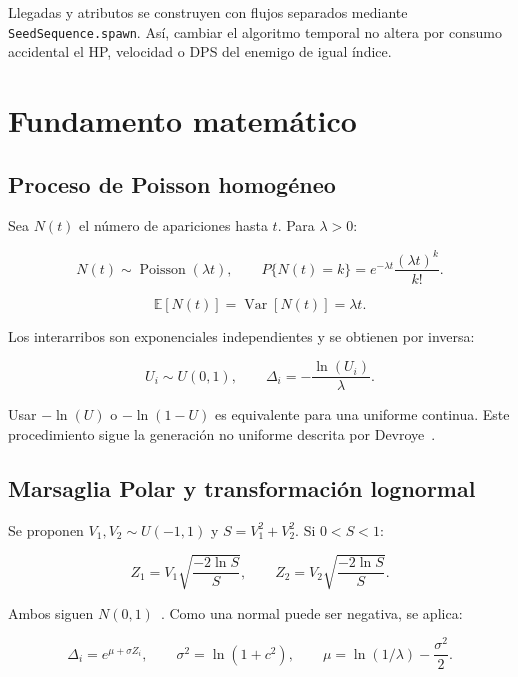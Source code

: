 \documentclass[11pt,a4paper]{article}
\begin{document}
Llegadas y atributos se construyen con flujos separados mediante
\texttt{SeedSequence.spawn}. Así, cambiar el algoritmo temporal no altera por
consumo accidental el HP, velocidad o DPS del enemigo de igual índice.

\section{Fundamento matemático}

\subsection{Proceso de Poisson homogéneo}

Sea $N(t)$ el número de apariciones hasta $t$. Para $\lambda>0$:

\begin{equation}
N(t)\sim\operatorname{Poisson}(\lambda t),\qquad
P\{N(t)=k\}=e^{-\lambda t}\frac{(\lambda t)^k}{k!}.
\end{equation}

\begin{equation}
\mathbb{E}[N(t)]=\operatorname{Var}[N(t)]=\lambda t.
\end{equation}

Los interarribos son exponenciales independientes y se obtienen por inversa:

\begin{equation}
U_i\sim U(0,1),\qquad
\boxed{\Delta_i=-\frac{\ln(U_i)}{\lambda}}.
\end{equation}

Usar $-\ln(U)$ o $-\ln(1-U)$ es equivalente para una uniforme continua.
Este procedimiento sigue la generación no uniforme descrita por
Devroye~\cite{devroye}.

\subsection{Marsaglia Polar y transformación lognormal}

Se proponen $V_1,V_2\sim U(-1,1)$ y $S=V_1^2+V_2^2$. Si $0<S<1$:

\begin{equation}
Z_1=V_1\sqrt{\frac{-2\ln S}{S}},\qquad
Z_2=V_2\sqrt{\frac{-2\ln S}{S}}.
\end{equation}

Ambos siguen $N(0,1)$~\cite{marsaglia}. Como una normal puede ser negativa,
se aplica:

\begin{equation}
\Delta_i=e^{\mu+\sigma Z_i},\qquad
\sigma^2=\ln(1+c^2),\qquad
\mu=\ln(1/\lambda)-\frac{\sigma^2}{2}.
\end{equation}
\end{document}
